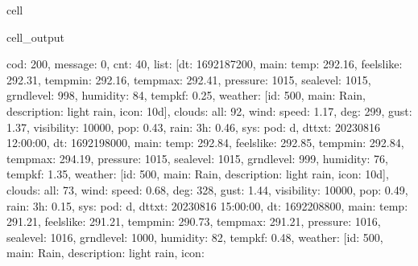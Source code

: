 \documentclass[letterpaper,10pt,english]{jupyterBook}
\begin{document}
\begin{sphinxuseclass}{cell}
\begin{sphinxVerbatimOutput}
\begin{sphinxuseclass}{cell_output}
\begin{sphinxVerbatim}[commandchars=\\\{\}]
\PYGZdq{}\PYGZob{}\PYGZsq{}cod\PYGZsq{}: \PYGZsq{}200\PYGZsq{}, \PYGZsq{}message\PYGZsq{}: 0, \PYGZsq{}cnt\PYGZsq{}: 40, \PYGZsq{}list\PYGZsq{}: [\PYGZob{}\PYGZsq{}dt\PYGZsq{}: 1692187200, \PYGZsq{}main\PYGZsq{}: \PYGZob{}\PYGZsq{}temp\PYGZsq{}: 292.16, \PYGZsq{}feels\PYGZus{}like\PYGZsq{}: 292.31, \PYGZsq{}temp\PYGZus{}min\PYGZsq{}: 292.16, \PYGZsq{}temp\PYGZus{}max\PYGZsq{}: 292.41, \PYGZsq{}pressure\PYGZsq{}: 1015, \PYGZsq{}sea\PYGZus{}level\PYGZsq{}: 1015, \PYGZsq{}grnd\PYGZus{}level\PYGZsq{}: 998, \PYGZsq{}humidity\PYGZsq{}: 84, \PYGZsq{}temp\PYGZus{}kf\PYGZsq{}: \PYGZhy{}0.25\PYGZcb{}, \PYGZsq{}weather\PYGZsq{}: [\PYGZob{}\PYGZsq{}id\PYGZsq{}: 500, \PYGZsq{}main\PYGZsq{}: \PYGZsq{}Rain\PYGZsq{}, \PYGZsq{}description\PYGZsq{}: \PYGZsq{}light rain\PYGZsq{}, \PYGZsq{}icon\PYGZsq{}: \PYGZsq{}10d\PYGZsq{}\PYGZcb{}], \PYGZsq{}clouds\PYGZsq{}: \PYGZob{}\PYGZsq{}all\PYGZsq{}: 92\PYGZcb{}, \PYGZsq{}wind\PYGZsq{}: \PYGZob{}\PYGZsq{}speed\PYGZsq{}: 1.17, \PYGZsq{}deg\PYGZsq{}: 299, \PYGZsq{}gust\PYGZsq{}: 1.37\PYGZcb{}, \PYGZsq{}visibility\PYGZsq{}: 10000, \PYGZsq{}pop\PYGZsq{}: 0.43, \PYGZsq{}rain\PYGZsq{}: \PYGZob{}\PYGZsq{}3h\PYGZsq{}: 0.46\PYGZcb{}, \PYGZsq{}sys\PYGZsq{}: \PYGZob{}\PYGZsq{}pod\PYGZsq{}: \PYGZsq{}d\PYGZsq{}\PYGZcb{}, \PYGZsq{}dt\PYGZus{}txt\PYGZsq{}: \PYGZsq{}2023\PYGZhy{}08\PYGZhy{}16 12:00:00\PYGZsq{}\PYGZcb{}, \PYGZob{}\PYGZsq{}dt\PYGZsq{}: 1692198000, \PYGZsq{}main\PYGZsq{}: \PYGZob{}\PYGZsq{}temp\PYGZsq{}: 292.84, \PYGZsq{}feels\PYGZus{}like\PYGZsq{}: 292.85, \PYGZsq{}temp\PYGZus{}min\PYGZsq{}: 292.84, \PYGZsq{}temp\PYGZus{}max\PYGZsq{}: 294.19, \PYGZsq{}pressure\PYGZsq{}: 1015, \PYGZsq{}sea\PYGZus{}level\PYGZsq{}: 1015, \PYGZsq{}grnd\PYGZus{}level\PYGZsq{}: 999, \PYGZsq{}humidity\PYGZsq{}: 76, \PYGZsq{}temp\PYGZus{}kf\PYGZsq{}: \PYGZhy{}1.35\PYGZcb{}, \PYGZsq{}weather\PYGZsq{}: [\PYGZob{}\PYGZsq{}id\PYGZsq{}: 500, \PYGZsq{}main\PYGZsq{}: \PYGZsq{}Rain\PYGZsq{}, \PYGZsq{}description\PYGZsq{}: \PYGZsq{}light rain\PYGZsq{}, \PYGZsq{}icon\PYGZsq{}: \PYGZsq{}10d\PYGZsq{}\PYGZcb{}], \PYGZsq{}clouds\PYGZsq{}: \PYGZob{}\PYGZsq{}all\PYGZsq{}: 73\PYGZcb{}, \PYGZsq{}wind\PYGZsq{}: \PYGZob{}\PYGZsq{}speed\PYGZsq{}: 0.68, \PYGZsq{}deg\PYGZsq{}: 328, \PYGZsq{}gust\PYGZsq{}: 1.44\PYGZcb{}, \PYGZsq{}visibility\PYGZsq{}: 10000, \PYGZsq{}pop\PYGZsq{}: 0.49, \PYGZsq{}rain\PYGZsq{}: \PYGZob{}\PYGZsq{}3h\PYGZsq{}: 0.15\PYGZcb{}, \PYGZsq{}sys\PYGZsq{}: \PYGZob{}\PYGZsq{}pod\PYGZsq{}: \PYGZsq{}d\PYGZsq{}\PYGZcb{}, \PYGZsq{}dt\PYGZus{}txt\PYGZsq{}: \PYGZsq{}2023\PYGZhy{}08\PYGZhy{}16 15:00:00\PYGZsq{}\PYGZcb{}, \PYGZob{}\PYGZsq{}dt\PYGZsq{}: 1692208800, \PYGZsq{}main\PYGZsq{}: \PYGZob{}\PYGZsq{}temp\PYGZsq{}: 291.21, \PYGZsq{}feels\PYGZus{}like\PYGZsq{}: 291.21, \PYGZsq{}temp\PYGZus{}min\PYGZsq{}: 290.73, \PYGZsq{}temp\PYGZus{}max\PYGZsq{}: 291.21, \PYGZsq{}pressure\PYGZsq{}: 1016, \PYGZsq{}sea\PYGZus{}level\PYGZsq{}: 1016, \PYGZsq{}grnd\PYGZus{}level\PYGZsq{}: 1000, \PYGZsq{}humidity\PYGZsq{}: 82, \PYGZsq{}temp\PYGZus{}kf\PYGZsq{}: 0.48\PYGZcb{}, \PYGZsq{}weather\PYGZsq{}: [\PYGZob{}\PYGZsq{}id\PYGZsq{}: 500, \PYGZsq{}main\PYGZsq{}: \PYGZsq{}Rain\PYGZsq{}, \PYGZsq{}description\PYGZsq{}: \PYGZsq{}light rain\PYGZsq{}, \PYGZsq{}icon\PYGZsq{}: 
\end{sphinxVerbatim}
\end{sphinxuseclass}
\end{sphinxVerbatimOutput}
\end{sphinxuseclass}
\end{document}

